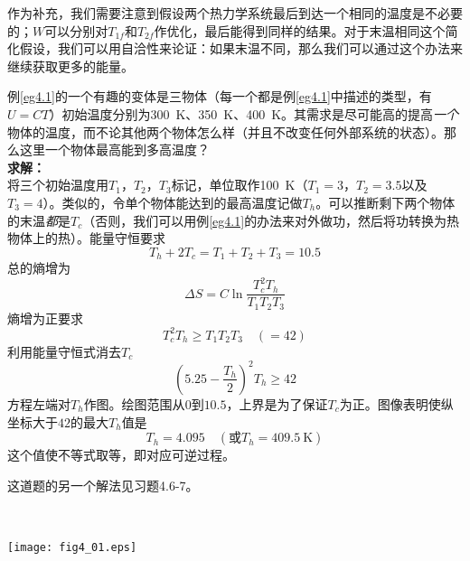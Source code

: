 作为补充，我们需要注意到假设两个热力学系统最后到达一个相同的温度是不必要的；$W$可以分别对$T_{1f}$和$T_{2f}$作优化，最后能得到同样的结果。对于末温相同这个简化假设，我们可以用自洽性来论证：如果末温不同，那么我们可以通过这个办法来继续获取更多的能量。

\begin{example}\label{eg4.2}
例\ref{eg4.1}的一个有趣的变体是三物体（每一个都是例\ref{eg4.1}中描述的类型，有$U=CT$）初始温度分别为\SI{300}{\kelvin}、\SI{350}{\kelvin}、\SI{400}{\kelvin}。其需求是尽可能高的提高{\it 一个}物体的温度，而不论其他两个物体怎么样（并且不改变任何外部系统的状态）。那么这里一个物体最高能到多高温度？\\
{\bf 求解：}\\
将三个初始温度用$T_1$，$T_2$，$T_3$标记，单位取作\SI{100}{\kelvin}（$T_1=3$，$T_2=3.5$以及$T_3=4$）。类似的，令单个物体能达到的最高温度记做$T_h$。可以推断剩下两个物体的末温{\it 都}是$T_c$（否则，我们可以用例\ref{eg4.1}的办法来对外做功，然后将功转换为热物体上的热）。能量守恒要求
\[
T_h + 2T_c = T_1 + T_2 + T_3 = 10.5
\]
总的熵增为
\[
\Delta S = C\ln\frac{T_c^2T_h}{T_1T_2T_3}
\]
熵增为正要求
\[
T_c^2T_h \ge T_1T_2T_3 \quad (=42)
\]
利用能量守恒式消去$T_c$
\[
(5.25-\frac{T_h}{2})^2T_h\ge 42
\]
方程左端对$T_h$作图。绘图范围从$0$到$10.5$，上界是为了保证$T_c$为正。图像表明使纵坐标大于$42$的最大$T_h$值是
\[
T_h = 4.095 \quad(\text{或}T_h = \SI{409.5}{\kelvin})
\]
这个值使不等式取等，即对应可逆过程。
\end{example}

这道题的另一个解法见习题4.6-7。

\ 

{
	\centering
	\texttt{[image: fig4\_01.eps]} 
	\figcaption{ }
}

